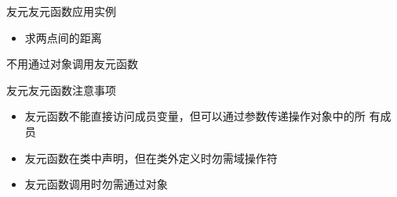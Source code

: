 \begin{frame}[t, fragile]{友元}{友元函数应用实例}%
  \begin{itemize}
  \item 求两点间的距离
  \end{itemize}
  \begin{center}
    \begin{minipage}{0.47\linewidth}
    \end{minipage}\quad
    \begin{minipage}{0.47\linewidth}
      \centering
      \tiny
      \vspace{4ex}
      \alert{不用通过对象调用友元函数}\\
    \end{minipage}
  \end{center}
\end{frame}

\begin{frame}[t, fragile]{友元}{友元函数注意事项}%
  \stretchon
  \begin{itemize}
  \item 友元函数不能直接访问成员变量，但可以通过参数传递操作对象中的所
    有成员
  \item 友元函数在类中声明，但在类外定义时勿需域操作符
  \item 友元函数调用时勿需通过对象
  \end{itemize}
  \stretchoff
\end{frame}

